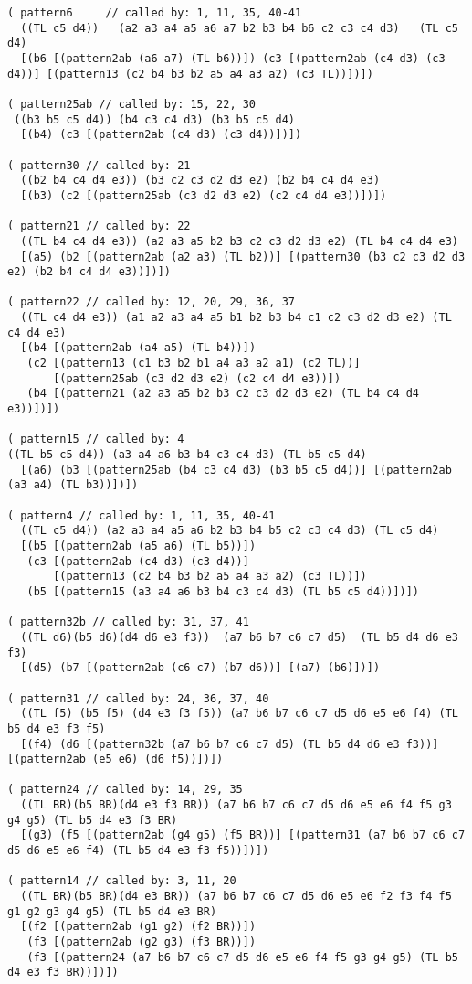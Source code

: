 {\begin{verbatim}
( pattern6     // called by: 1, 11, 35, 40-41
  ((TL c5 d4))   (a2 a3 a4 a5 a6 a7 b2 b3 b4 b6 c2 c3 c4 d3)   (TL c5 d4)
  [(b6 [(pattern2ab (a6 a7) (TL b6))]) (c3 [(pattern2ab (c4 d3) (c3 d4))] [(pattern13 (c2 b4 b3 b2 a5 a4 a3 a2) (c3 TL))])])

( pattern25ab // called by: 15, 22, 30
 ((b3 b5 c5 d4)) (b4 c3 c4 d3) (b3 b5 c5 d4)
  [(b4) (c3 [(pattern2ab (c4 d3) (c3 d4))])])

( pattern30 // called by: 21
  ((b2 b4 c4 d4 e3)) (b3 c2 c3 d2 d3 e2) (b2 b4 c4 d4 e3)
  [(b3) (c2 [(pattern25ab (c3 d2 d3 e2) (c2 c4 d4 e3))])])

( pattern21 // called by: 22
  ((TL b4 c4 d4 e3)) (a2 a3 a5 b2 b3 c2 c3 d2 d3 e2) (TL b4 c4 d4 e3)
  [(a5) (b2 [(pattern2ab (a2 a3) (TL b2))] [(pattern30 (b3 c2 c3 d2 d3 e2) (b2 b4 c4 d4 e3))])])

( pattern22 // called by: 12, 20, 29, 36, 37
  ((TL c4 d4 e3)) (a1 a2 a3 a4 a5 b1 b2 b3 b4 c1 c2 c3 d2 d3 e2) (TL c4 d4 e3)
  [(b4 [(pattern2ab (a4 a5) (TL b4))])
   (c2 [(pattern13 (c1 b3 b2 b1 a4 a3 a2 a1) (c2 TL))]
       [(pattern25ab (c3 d2 d3 e2) (c2 c4 d4 e3))])
   (b4 [(pattern21 (a2 a3 a5 b2 b3 c2 c3 d2 d3 e2) (TL b4 c4 d4 e3))])])

( pattern15 // called by: 4
((TL b5 c5 d4)) (a3 a4 a6 b3 b4 c3 c4 d3) (TL b5 c5 d4)
  [(a6) (b3 [(pattern25ab (b4 c3 c4 d3) (b3 b5 c5 d4))] [(pattern2ab (a3 a4) (TL b3))])])

( pattern4 // called by: 1, 11, 35, 40-41
  ((TL c5 d4)) (a2 a3 a4 a5 a6 b2 b3 b4 b5 c2 c3 c4 d3) (TL c5 d4)
  [(b5 [(pattern2ab (a5 a6) (TL b5))])
   (c3 [(pattern2ab (c4 d3) (c3 d4))]
       [(pattern13 (c2 b4 b3 b2 a5 a4 a3 a2) (c3 TL))])
   (b5 [(pattern15 (a3 a4 a6 b3 b4 c3 c4 d3) (TL b5 c5 d4))])])

( pattern32b // called by: 31, 37, 41
  ((TL d6)(b5 d6)(d4 d6 e3 f3))  (a7 b6 b7 c6 c7 d5)  (TL b5 d4 d6 e3 f3)
  [(d5) (b7 [(pattern2ab (c6 c7) (b7 d6))] [(a7) (b6)])])

( pattern31 // called by: 24, 36, 37, 40
  ((TL f5) (b5 f5) (d4 e3 f3 f5)) (a7 b6 b7 c6 c7 d5 d6 e5 e6 f4) (TL b5 d4 e3 f3 f5)
  [(f4) (d6 [(pattern32b (a7 b6 b7 c6 c7 d5) (TL b5 d4 d6 e3 f3))] [(pattern2ab (e5 e6) (d6 f5))])])

( pattern24 // called by: 14, 29, 35
  ((TL BR)(b5 BR)(d4 e3 f3 BR)) (a7 b6 b7 c6 c7 d5 d6 e5 e6 f4 f5 g3 g4 g5) (TL b5 d4 e3 f3 BR)
  [(g3) (f5 [(pattern2ab (g4 g5) (f5 BR))] [(pattern31 (a7 b6 b7 c6 c7 d5 d6 e5 e6 f4) (TL b5 d4 e3 f3 f5))])])

( pattern14 // called by: 3, 11, 20
  ((TL BR)(b5 BR)(d4 e3 BR)) (a7 b6 b7 c6 c7 d5 d6 e5 e6 f2 f3 f4 f5 g1 g2 g3 g4 g5) (TL b5 d4 e3 BR)
  [(f2 [(pattern2ab (g1 g2) (f2 BR))])
   (f3 [(pattern2ab (g2 g3) (f3 BR))])
   (f3 [(pattern24 (a7 b6 b7 c6 c7 d5 d6 e5 e6 f4 f5 g3 g4 g5) (TL b5 d4 e3 f3 BR))])])


\end{verbatim}}
